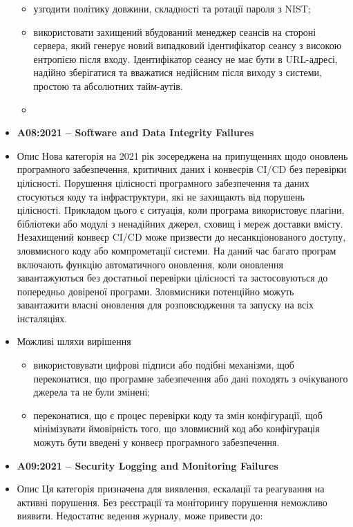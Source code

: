 \begin{itemize}
\begin{itemize}
                    \item узгодити політику довжини, складності та ротації пароля з NIST;
                    \item використовати захищений вбудований менеджер сеансів на стороні сервера, який генерує новий випадковий ідентифікатор сеансу з високою ентропією після входу. Ідентифікатор сеансу не має бути в URL-адресі, надійно зберігатися та вважатися недійсним після виходу з системи, простою та абсолютних тайм-аутів.
                    \item
                \end{itemize}
    \item \textbf{A08:2021 – Software and Data Integrity Failures}
            \item Опис
                Нова категорія на 2021 рік зосереджена на припущеннях щодо оновлень програмного забезпечення, критичних даних і конвеєрів CI/CD без перевірки цілісності. Порушення цілісності програмного забезпечення та даних стосуються коду та інфраструктури, які не захищають від порушень цілісності. Прикладом цього є ситуація, коли програма використовує плагіни, бібліотеки або модулі з ненадійних джерел, сховищ і мереж доставки вмісту. Незахищений конвеєр CI/CD може призвести до несанкціонованого доступу, зловмисного коду або компрометації системи. На даний час багато програм включають функцію автоматичного оновлення, коли оновлення завантажуються без достатньої перевірки цілісності та застосовуються до попередньо довіреної програми. Зловмисники потенційно можуть завантажити власні оновлення для розповсюдження та запуску на всіх інсталяціях.
            \item Можливі шляхи вирішення
                \begin{itemize}
                    \item використовувати цифрові підписи або подібні механізми, щоб переконатися, що програмне забезпечення або дані походять з очікуваного джерела та не були змінені;
                    \item переконатися, що є процес перевірки коду та змін конфігурації, щоб мінімізувати ймовірність того, що зловмисний код або конфігурація можуть бути введені у конвеєр програмного забезпечення.
                \end{itemize}
    \item \textbf{A09:2021 – Security Logging and Monitoring Failures}
            \item Опис
                Ця категорія призначена для виявлення, ескалації та реагування на активні порушення. Без реєстрації та моніторингу порушення неможливо виявити. Недостатнє ведення журналу, може привести до:

\end{itemize}
